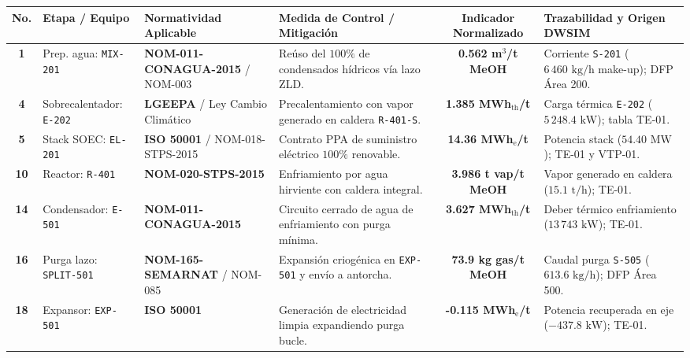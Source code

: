 \documentclass[10pt,landscape]{article}
\begin{document}
\scriptsize
\renewcommand{\arraystretch}{1.14}
\begin{tabularx}{\textwidth}{c p{2.8cm} p{3.2cm} p{3.8cm} c X}
  \toprule
  \rowcolor{tableheader}
  \textbf{\color{white}No.} & \textbf{\color{white}Etapa / Equipo} & \textbf{\color{white}Normatividad Aplicable} & \textbf{\color{white}Medida de Control / Mitigación} & \textbf{\color{white}Indicador Normalizado} & \textbf{\color{white}Trazabilidad y Origen DWSIM} \\
  \midrule
  \rowcolor{roweven}
  \textbf{1} & Prep. agua: \texttt{MIX-201} & \textbf{NOM-011-CONAGUA-2015} / NOM-003 & Reúso del $100\%$ de condensados hídricos vía lazo ZLD. & \textbf{0.562 m$^3$/t MeOH} & Corriente \texttt{S-201} ($6\,460\text{ kg/h}$ make-up); DFP Área 200. \\
  \rowcolor{rowodd}
  \textbf{4} & Sobrecalentador: \texttt{E-202} & \textbf{LGEEPA} / Ley Cambio Climático & Precalentamiento con vapor generado en caldera \texttt{R-401-S}. & \textbf{1.385 MWh$_{\text{th}}$/t} & Carga térmica \texttt{E-202} ($5\,248.4\text{ kW}$); tabla TE-01. \\
  \rowcolor{roweven}
  \textbf{5} & Stack SOEC: \texttt{EL-201} & \textbf{ISO 50001} / NOM-018-STPS-2015 & Contrato PPA de suministro eléctrico $100\%$ renovable. & \textbf{14.36 MWh$_{\text{e}}$/t} & Potencia stack ($54.40\text{ MW}$); TE-01 y VTP-01. \\
  \rowcolor{rowodd}
  \textbf{10} & Reactor: \texttt{R-401} & \textbf{NOM-020-STPS-2015} & Enfriamiento por agua hirviente con caldera integral. & \textbf{3.986 t vap/t MeOH} & Vapor generado en caldera ($15.1\text{ t/h}$); TE-01. \\
  \rowcolor{roweven}
  \textbf{14} & Condensador: \texttt{E-501} & \textbf{NOM-011-CONAGUA-2015} & Circuito cerrado de agua de enfriamiento con purga mínima. & \textbf{3.627 MWh$_{\text{th}}$/t} & Deber térmico enfriamiento ($13\,743\text{ kW}$); TE-01. \\
  \rowcolor{rowodd}
  \textbf{16} & Purga lazo: \texttt{SPLIT-501} & \textbf{NOM-165-SEMARNAT} / NOM-085 & Expansión criogénica en \texttt{EXP-501} y envío a antorcha. & \textbf{73.9 kg gas/t MeOH} & Caudal purga \texttt{S-505} ($613.6\text{ kg/h}$); DFP Área 500. \\
  \rowcolor{roweven}
  \textbf{18} & Expansor: \texttt{EXP-501} & \textbf{ISO 50001} & Generación de electricidad limpia expandiendo purga bucle. & \textbf{-0.115 MWh$_{\text{e}}$/t} & Potencia recuperada en eje ($-437.8\text{ kW}$); TE-01. \\

\end{tabularx}
\end{document}
